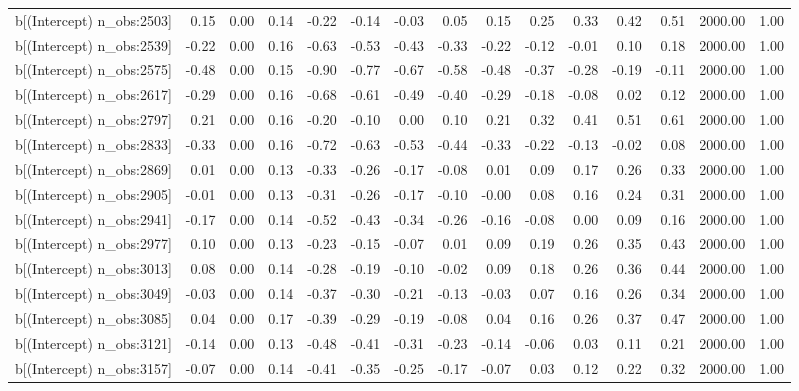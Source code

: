 \begin{table}[ht]
\begin{tabular}{rrrrrrrrrrrrrrr}
  b[(Intercept) n\_obs:2503] & 0.15 & 0.00 & 0.14 & -0.22 & -0.14 & -0.03 & 0.05 & 0.15 & 0.25 & 0.33 & 0.42 & 0.51 & 2000.00 & 1.00 \\ 
  b[(Intercept) n\_obs:2539] & -0.22 & 0.00 & 0.16 & -0.63 & -0.53 & -0.43 & -0.33 & -0.22 & -0.12 & -0.01 & 0.10 & 0.18 & 2000.00 & 1.00 \\ 
  b[(Intercept) n\_obs:2575] & -0.48 & 0.00 & 0.15 & -0.90 & -0.77 & -0.67 & -0.58 & -0.48 & -0.37 & -0.28 & -0.19 & -0.11 & 2000.00 & 1.00 \\ 
  b[(Intercept) n\_obs:2617] & -0.29 & 0.00 & 0.16 & -0.68 & -0.61 & -0.49 & -0.40 & -0.29 & -0.18 & -0.08 & 0.02 & 0.12 & 2000.00 & 1.00 \\ 
  b[(Intercept) n\_obs:2797] & 0.21 & 0.00 & 0.16 & -0.20 & -0.10 & 0.00 & 0.10 & 0.21 & 0.32 & 0.41 & 0.51 & 0.61 & 2000.00 & 1.00 \\ 
  b[(Intercept) n\_obs:2833] & -0.33 & 0.00 & 0.16 & -0.72 & -0.63 & -0.53 & -0.44 & -0.33 & -0.22 & -0.13 & -0.02 & 0.08 & 2000.00 & 1.00 \\ 
  b[(Intercept) n\_obs:2869] & 0.01 & 0.00 & 0.13 & -0.33 & -0.26 & -0.17 & -0.08 & 0.01 & 0.09 & 0.17 & 0.26 & 0.33 & 2000.00 & 1.00 \\ 
  b[(Intercept) n\_obs:2905] & -0.01 & 0.00 & 0.13 & -0.31 & -0.26 & -0.17 & -0.10 & -0.00 & 0.08 & 0.16 & 0.24 & 0.31 & 2000.00 & 1.00 \\ 
  b[(Intercept) n\_obs:2941] & -0.17 & 0.00 & 0.14 & -0.52 & -0.43 & -0.34 & -0.26 & -0.16 & -0.08 & 0.00 & 0.09 & 0.16 & 2000.00 & 1.00 \\ 
  b[(Intercept) n\_obs:2977] & 0.10 & 0.00 & 0.13 & -0.23 & -0.15 & -0.07 & 0.01 & 0.09 & 0.19 & 0.26 & 0.35 & 0.43 & 2000.00 & 1.00 \\ 
  b[(Intercept) n\_obs:3013] & 0.08 & 0.00 & 0.14 & -0.28 & -0.19 & -0.10 & -0.02 & 0.09 & 0.18 & 0.26 & 0.36 & 0.44 & 2000.00 & 1.00 \\ 
  b[(Intercept) n\_obs:3049] & -0.03 & 0.00 & 0.14 & -0.37 & -0.30 & -0.21 & -0.13 & -0.03 & 0.07 & 0.16 & 0.26 & 0.34 & 2000.00 & 1.00 \\ 
  b[(Intercept) n\_obs:3085] & 0.04 & 0.00 & 0.17 & -0.39 & -0.29 & -0.19 & -0.08 & 0.04 & 0.16 & 0.26 & 0.37 & 0.47 & 2000.00 & 1.00 \\ 
  b[(Intercept) n\_obs:3121] & -0.14 & 0.00 & 0.13 & -0.48 & -0.41 & -0.31 & -0.23 & -0.14 & -0.06 & 0.03 & 0.11 & 0.21 & 2000.00 & 1.00 \\ 
  b[(Intercept) n\_obs:3157] & -0.07 & 0.00 & 0.14 & -0.41 & -0.35 & -0.25 & -0.17 & -0.07 & 0.03 & 0.12 & 0.22 & 0.32 & 2000.00 & 1.00 \\ 

\end{tabular}
\end{table}

